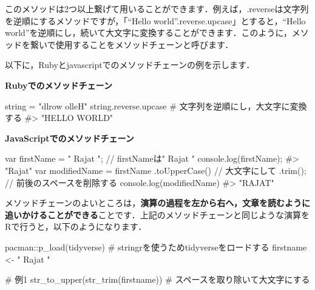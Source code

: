 \documentclass[
  letterpaper,
  DIV=11,
  numbers=noendperiod]{scrreprt}
\newenvironment{Shaded}{\begin{snugshade}}{\end{snugshade}}
\newcommand{\AttributeTok}[1]{\textcolor[rgb]{0.40,0.45,0.13}{#1}}
\newcommand{\BuiltInTok}[1]{\textcolor[rgb]{0.00,0.23,0.31}{#1}}
\newcommand{\CommentTok}[1]{\textcolor[rgb]{0.37,0.37,0.37}{#1}}
\newcommand{\FunctionTok}[1]{\textcolor[rgb]{0.28,0.35,0.67}{#1}}
\newcommand{\KeywordTok}[1]{\textcolor[rgb]{0.00,0.23,0.31}{#1}}
\newcommand{\NormalTok}[1]{\textcolor[rgb]{0.00,0.23,0.31}{#1}}
\newcommand{\OperatorTok}[1]{\textcolor[rgb]{0.37,0.37,0.37}{#1}}
\newcommand{\OtherTok}[1]{\textcolor[rgb]{0.00,0.23,0.31}{#1}}
\newcommand{\SpecialCharTok}[1]{\textcolor[rgb]{0.37,0.37,0.37}{#1}}
\newcommand{\StringTok}[1]{\textcolor[rgb]{0.13,0.47,0.30}{#1}}
\begin{document}
このメソッドは2つ以上繋げて用いることができます．例えば，.reverseは文字列を逆順にするメソッドですが，「``Hello
world''.reverse.upcase」とすると，``Hello
world''を逆順にし，続いて大文字に変換することができます．このように，メソッドを繋いで使用することをメソッドチェーンと呼びます．

以下に，Rubyとjavascriptでのメソッドチェーンの例を示します．

\textbf{Rubyでのメソッドチェーン}

\begin{Shaded}
\begin{Highlighting}[]
\NormalTok{string }\KeywordTok{=} \StringTok{"dlrow olleH"}
\NormalTok{string}\AttributeTok{.reverse.upcase} \CommentTok{\# 文字列を逆順にし，大文字に変換する}
\CommentTok{\#\textgreater{}  "HELLO WORLD"}
\end{Highlighting}
\end{Shaded}

\textbf{JavaScriptでのメソッドチェーン}

\begin{Shaded}
\begin{Highlighting}[]
\KeywordTok{var}\NormalTok{ firstName }\OperatorTok{=} \StringTok{" Rajat "}\OperatorTok{;} \CommentTok{// firstNameは" Rajat "}
\BuiltInTok{console}\OperatorTok{.}\FunctionTok{log}\NormalTok{(firstName)}\OperatorTok{;} 
\NormalTok{\#}\OperatorTok{\textgreater{}} \StringTok{"Rajat"}
\KeywordTok{var}\NormalTok{ modifiedName }\OperatorTok{=} 
\NormalTok{  firstName }
    \OperatorTok{.}\FunctionTok{toUpperCase}\NormalTok{() }\CommentTok{// 大文字にして}
        \OperatorTok{.}\FunctionTok{trim}\NormalTok{()}\OperatorTok{;} \CommentTok{// 前後のスペースを削除する}
\BuiltInTok{console}\OperatorTok{.}\FunctionTok{log}\NormalTok{(modifiedName)}
\NormalTok{\#}\OperatorTok{\textgreater{}} \StringTok{"RAJAT"}
\end{Highlighting}
\end{Shaded}

メソッドチェーンのよいところは，\textbf{演算の過程を左から右へ，文章を読むように追いかけることができる}ことです．上記のメソッドチェーンと同じような演算をRで行うと，以下のようになります．

\begin{Shaded}
\begin{Highlighting}[]
\NormalTok{pacman}\SpecialCharTok{::}\FunctionTok{p\_load}\NormalTok{(tidyverse) }\CommentTok{\# stringrを使うためtidyverseをロードする}
\NormalTok{firstname }\OtherTok{\textless{}{-}} \StringTok{" Rajat "}

\CommentTok{\# 例1}
\FunctionTok{str\_to\_upper}\NormalTok{(}\FunctionTok{str\_trim}\NormalTok{(firstname)) }\CommentTok{\# スペースを取り除いて大文字にする}
\end{Highlighting}
\end{Shaded}
\end{document}
